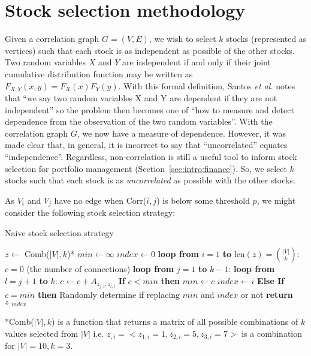 \section{Stock selection methodology}
\label{sec:usage:stockselection}

Given a correlation graph $G=(V,E)$, we wish to select $k$ stocks (represented 
as vertices) such that each stock is as independent as possible of the other 
stocks. Two random variables $X$ and $Y$ are independent if and only if their 
joint cumulative distribution function may be written as 
$F_{X,Y}(x,y)=F_X(x)F_Y(y)$. With this formal definition, Santos \textit{et 
al.} notes that ``we say two random variables X and Y are dependent if they
are not independent'' so the problem then becomes one of ``how to measure and 
detect dependence from the observation of the two random 
variables''\cite{santos2013}. With the correlation graph $G$, we now have 
a measure of dependence. However, it was made clear that, in general, 
it is incorrect to say that ``uncorrelated'' equates ``independence''. 
Regardless, non-correlation is still a useful tool to inform stock selection 
for portfolio management (Section~\ref{sec:intro:finance}). So, we select $k$ 
stocks such that each stock is as \textit{uncorrelated} as possible with the 
other stocks.

As $V_i$ and $V_j$ have no edge when Corr($i,j$) is below some threshold $p$, 
we might consider the following stock selection strategy:

\tablespacing
\begin{algorithm}[H]
	\caption{Naive stock selection strategy}\label{alg:usage:stockselection1}
	\begin{algorithmic}[1]
		\State $z \gets$ Comb($|V|,k$)*
		\State $min \gets \infty$
		\State $index \gets 0$
		\State \textbf{loop from} $i=1$ \textbf{to} $\text{len}(z) = 
		{|V| \choose k}$:
		\State \indent $c = 0$ (the number of connections)
		\State \indent \textbf{loop from} $j = 1$ \textbf{to} $k-1$:
		\State \indent \indent \textbf{loop from} $l=j+1$ \textbf{to} $k$:
		\State \indent \indent \indent $c \gets c+A_{z_{j,i},z_{l,i}}$
		\State \indent \textbf{If} $c < min$ \textbf{then}
		\State \indent \indent $min \gets c$
		\State \indent \indent $index \gets i$
		\State \indent \textbf{Else If} $c = min$ \textbf{then}
		\State \indent \indent Randomly determine if replacing $min$ and 
		$index$ or not
		\State \textbf{return} $z_{,index}$
		\EndProcedure
	\end{algorithmic}
	*Comb($|V|,k$) is a function that returns a matrix of all possible 
	combinations of $k$ values selected from $|V|$ i.e. $z_{,i}=<z_{1,i} = 1, 
	z_{2,i} = 5, z_{3,i} = 7>$ is a combination for $|V|=10,k=3$.
\end{algorithm}
\bodyspacing

